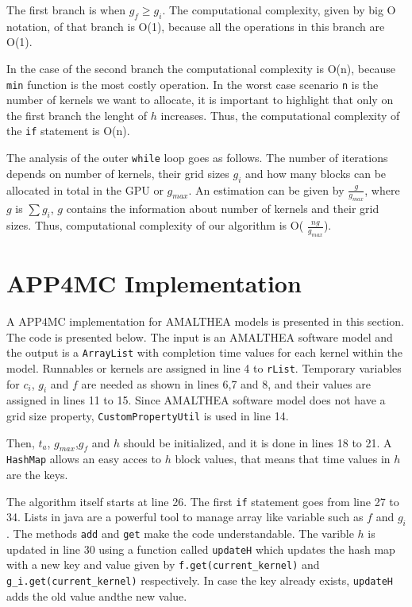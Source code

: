 \documentclass[
  12pt,
  a4paperpaper,
]{report}
\begin{document}
The first branch is when \(g_f \geq g_i\). The computational complexity,
given by big O notation, of that branch is O(1), because all the
operations in this branch are O(1).

In the case of the second branch the computational complexity is O(n),
because \texttt{min} function is the most costly operation. In the worst
case scenario \texttt{n} is the number of kernels we want to allocate,
it is important to highlight that only on the first branch the lenght of
\(h\) increases. Thus, the computational complexity of the \texttt{if}
statement is O(n).

The analysis of the outer \texttt{while} loop goes as follows. The number of iterations
depends on number of kernels, their grid sizes \(g_i\) and how many
blocks can be allocated in total in the GPU or \(g_{max}\). An
estimation can be given by \(\frac{g}{g_{max}}\), where \(g\) is
\(\sum g_i\), \(g\) contains the information about number of kernels and
their grid sizes. Thus, computational complexity of our algorithm is O(
\(\frac{ng}{g_{max}}\)).

\hypertarget{app4mc-implementation}{%
\section{APP4MC Implementation}\label{app4mc-implementation}}
A APP4MC implementation for AMALTHEA models is presented in this section. 
The code is presented below. 
The input is an AMALTHEA software model and the output is a \texttt{ArrayList} with completion time values for each kernel within the model. 
Runnables or kernels are assigned in line 4 to \texttt{rList}.
Temporary variables for \(c_i\), \(g_i\) and \(f\) are needed as shown in lines 6,7 and 8, and their values are assigned in lines 11 to 15. 
Since AMALTHEA software model does not have a grid size property, \texttt{CustomPropertyUtil} is used in line 14. 


Then, \(t_a\), \(g_{max}\),\(g_f\) and \(h\) should be initialized, and it is done in lines 18 to 21. 
A \texttt{HashMap} allows an easy acces to \(h\) block values, that means that time values in \(h\) are the keys.  



The algorithm itself starts at line 26. 
The first \texttt{if} statement goes from line 27 to 34.
Lists in java are a powerful tool to manage array like variable such as \(f\) and \(g_i\). 
The methods \texttt{add} and \texttt{get} make the code understandable.
The varible \(h\) is updated in line 30 using a function called \texttt{updateH} which updates the hash map with a new key and value given by \texttt{f.get(current\_kernel)} and \texttt{g\_i.get(current\_kernel)} respectively. In case the key already exists, \texttt{updateH} adds the old value andthe new value. 
\end{document}
